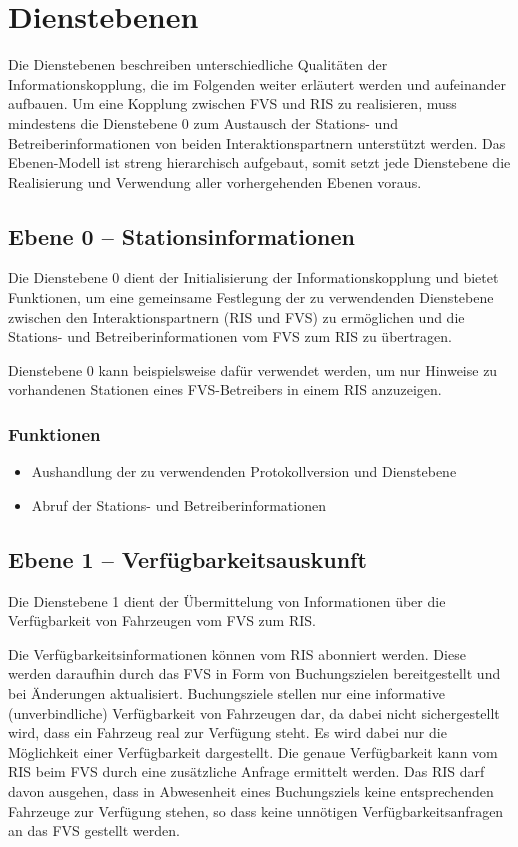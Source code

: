 \chapter{Dienstebenen}
\label{sec:Dienstebenen}
Die Dienstebenen beschreiben unterschiedliche Qualitäten der Informationskopplung, die im Folgenden weiter erläutert werden und aufeinander aufbauen. Um eine Kopplung zwischen FVS und RIS zu realisieren, muss mindestens die Dienstebene 0 zum Austausch der Stations- und Betreiberinformationen von beiden Interaktionspartnern unterstützt werden. Das Ebenen-Modell ist streng hierarchisch aufgebaut, somit setzt jede Dienstebene die Realisierung und Verwendung aller vorhergehenden Ebenen voraus.

 
\section{Ebene 0 -- Stationsinformationen}
Die Dienstebene 0 dient der Initialisierung der Informationskopplung und bietet Funktionen, um eine gemeinsame Festlegung der zu verwendenden Dienstebene zwischen den Interaktionspartnern (RIS und FVS) zu ermöglichen und die Stations- und Betreiberinformationen vom FVS zum RIS zu übertragen. 

Dienstebene 0 kann beispielsweise dafür verwendet werden, um nur Hinweise zu vorhandenen Stationen eines FVS-Betreibers in einem RIS anzuzeigen.
\subsection*{Funktionen}
\begin{itemize}
\item Aushandlung der zu verwendenden Protokollversion und Dienstebene
\item Abruf der Stations- und Betreiberinformationen
\end{itemize}

\section{Ebene 1 -- Verfügbarkeitsauskunft}
Die Dienstebene 1 dient der Übermittelung von Informationen über die Verfügbarkeit von Fahrzeugen vom FVS zum RIS.

Die Verfügbarkeitsinformationen können vom RIS abonniert werden. Diese werden daraufhin durch das FVS in Form von Buchungszielen bereitgestellt und bei Änderungen aktualisiert. Buchungsziele stellen nur eine informative (unverbindliche) Verfügbarkeit von Fahrzeugen dar, da dabei nicht sichergestellt wird, dass ein Fahrzeug real zur Verfügung steht. Es wird dabei nur die Möglichkeit einer Verfügbarkeit dargestellt. Die genaue Verfügbarkeit kann vom RIS beim FVS durch eine zusätzliche Anfrage ermittelt werden. Das RIS darf davon ausgehen, dass in Abwesenheit eines Buchungsziels keine entsprechenden Fahrzeuge zur Verfügung stehen, so dass keine unnötigen Verfügbarkeitsanfragen an das FVS gestellt werden.

